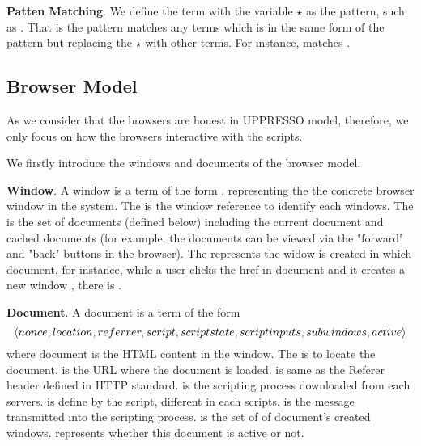 \begin{appendices}
\vspace{1mm}\noindent\textbf{Patten Matching}.  We define the term with the variable $\star$ as the pattern, such as . That is the pattern matches any terms which is in the same form of the pattern but replacing the $\star$ with other terms. For instance,   matches .

\subsection{Browser Model}
As we consider that  the browsers are honest in UPPRESSO model, therefore, we only focus on how the browsers interactive with the scripts. 

We firstly introduce the windows and documents of the browser model.

\vspace{1mm}\noindent\textbf{Window}. A window  is a term of the form , representing the  the concrete browser window in the system. The  is the window reference to identify each windows. The  is the set of documents (defined below) including the current document and cached documents (for example, the documents can be viewed via the "forward" and "back" buttons in the browser). The  represents the widow is created in which document, for instance, while a user clicks the href in document  and it creates a new window , there is . 

\vspace{1mm}\noindent\textbf{Document}. A document  is a term of the form
\begin{equation*}
  \langle {{}nonce, location, referrer, script, scriptstate, scriptinputs, subwindows, active} \rangle
\end{equation*} 
where document is the HTML content in the window.  The  is to locate the document.  is the URL where the document is loaded.  is same as the Referer header defined in HTTP standard.  is the scripting process downloaded from each servers.  is define by the script, different in each scripts.   is the message transmitted into the scripting process.  is the set of  of document's created windows.  represents whether this document is active or not.


\end{appendices}
